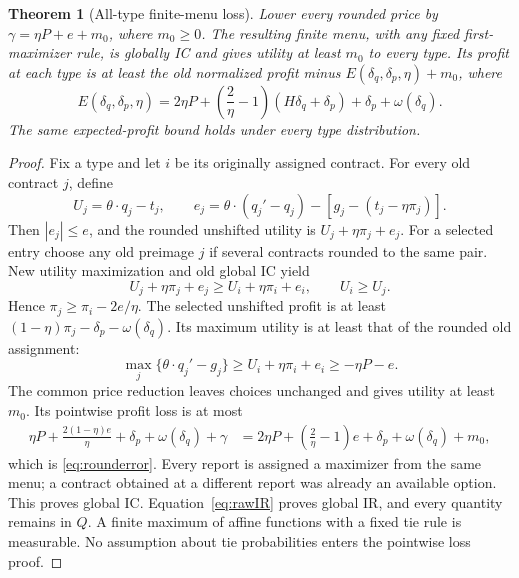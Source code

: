 \documentclass[11pt,a4paper]{article}
\numberwithin{equation}{section}
\newtheorem{theorem}{Theorem}
\begin{document}
\begin{theorem}[All-type finite-menu loss]\label{thm:rounding}
Lower every rounded price by \(\gamma=\eta P+e+m_0\), where \(m_0\ge0\).
The resulting finite menu, with any fixed first-maximizer rule, is
globally IC and gives utility at least \(m_0\) to every type.
Its profit at each type is at least the old normalized profit minus
\(E(\delta_q,\delta_p,\eta)+m_0\), where
\begin{equation}\label{eq:rounderror}
 E(\delta_q,\delta_p,\eta)
 =2\eta P+\left(\frac2\eta-1\right)(H\delta_q+\delta_p)
             +\delta_p+\omega(\delta_q).
\end{equation}
The same expected-profit bound holds under every type distribution.
\end{theorem}
\begin{proof}
Fix a type and let \(i\) be its originally assigned contract.
For every old contract \(j\), define
\[
 U_j=\theta\cdot q_j-t_j,\qquad
 e_j=\theta\cdot(q_j'-q_j)-[g_j-(t_j-\eta\pi_j)].
\]
Then \(|e_j|\le e\), and the rounded unshifted utility is
\(U_j+\eta\pi_j+e_j\).
For a selected entry choose any old preimage \(j\) if several
contracts rounded to the same pair.
New utility maximization and old global IC yield
\[
 U_j+\eta\pi_j+e_j\ge U_i+\eta\pi_i+e_i,\qquad U_i\ge U_j.
\]
Hence \(\pi_j\ge\pi_i-2e/\eta\).
The selected unshifted profit is at least
\((1-\eta)\pi_j-\delta_p-\omega(\delta_q)\).
Its maximum utility is at least that of the rounded old assignment:
\begin{equation}\label{eq:rawIR}
 \max_j\{\theta\cdot q_j'-g_j\}
 \ge U_i+\eta\pi_i+e_i\ge-\eta P-e.
\end{equation}
The common price reduction leaves choices unchanged and gives utility
at least \(m_0\). Its pointwise profit loss is at most
\begin{align*}
 \eta P+\frac{2(1-\eta)e}{\eta}
       +\delta_p+\omega(\delta_q)+\gamma
 &=2\eta P+\left(\frac2\eta-1\right)e
       +\delta_p+\omega(\delta_q)+m_0,
\end{align*}
which is \eqref{eq:rounderror}.
Every report is assigned a maximizer from the same menu; a contract
obtained at a different report was already an available option.
This proves global IC. Equation~\eqref{eq:rawIR} proves global IR,
and every quantity remains in \(Q\).
A finite maximum of affine functions with a fixed tie rule is
measurable. No assumption about tie probabilities enters the pointwise
loss proof.
\end{proof}
\end{document}
